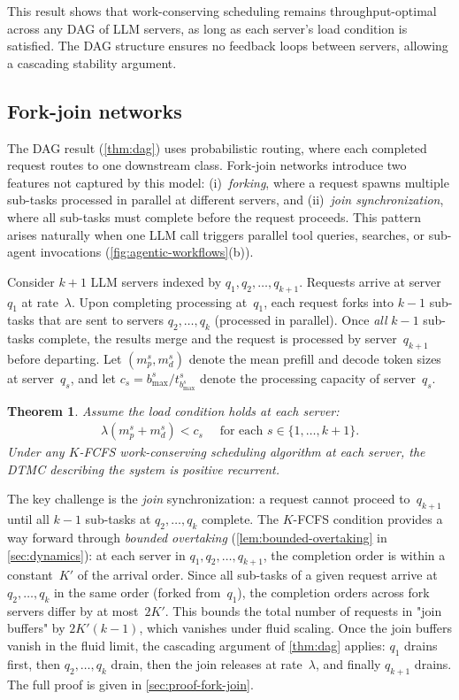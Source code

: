 \documentclass[11pt]{article}
\theoremstyle{plain}
\newtheorem{theorem}{Theorem}
\theoremstyle{definition}
\theoremstyle{remark}
\begin{document}
This result shows that work-conserving scheduling remains throughput-optimal across any DAG of LLM servers, as long as each server's load condition is satisfied. The DAG structure ensures no feedback loops between servers, allowing a cascading stability argument.

\subsection{Fork-join networks}
\label{sec:fork-join}

The DAG result (\cref{thm:dag}) uses probabilistic routing, where each completed request routes to one downstream class. Fork-join networks introduce two features not captured by this model: (i)~\emph{forking}, where a request spawns multiple sub-tasks processed in parallel at different servers, and (ii)~\emph{join synchronization}, where all sub-tasks must complete before the request proceeds. This pattern arises naturally when one LLM call triggers parallel tool queries, searches, or sub-agent invocations (\cref{fig:agentic-workflows}(b)).

Consider $k+1$ LLM servers indexed by $q_1,q_2,\ldots,q_{k+1}$. Requests arrive at server~$q_1$ at rate~$\lambda$. Upon completing processing at~$q_1$, each request forks into $k-1$ sub-tasks that are sent to servers $q_2,\ldots,q_k$ (processed in parallel). Once \emph{all} $k-1$ sub-tasks complete, the results merge and the request is processed by server~$q_{k+1}$ before departing. Let $(m^s_p, m^s_d)$ denote the mean prefill and decode token sizes at server~$q_s$, and let $c_s = b^s_{\max}/t^s_{b^s_{\max}}$ denote the processing capacity of server~$q_s$.

\begin{theorem}\label{thm:fork-join}
Assume the load condition holds at each server:
\begin{align}
  \label{eq:fj}
    \lambda(m^s_p+m^s_d) < c_s \quad  \text{ for each }
s\in \{1, \ldots, k+1\}.
\end{align}
Under any $K$-FCFS work-conserving scheduling algorithm at each server, the DTMC describing the system is positive recurrent.
\end{theorem}

The key challenge is the \emph{join} synchronization: a request cannot proceed to~$q_{k+1}$ until all $k-1$ sub-tasks at $q_2,\ldots,q_k$ complete. The $K$-FCFS condition provides a way forward through \emph{bounded overtaking} (\cref{lem:bounded-overtaking} in \cref{sec:dynamics}): at each server in $q_1, q_2,\ldots,q_{k+1}$, the completion order is within a constant~$K'$ of the arrival order. Since all sub-tasks of a given request arrive at $q_2,\ldots,q_k$ in the same order (forked from~$q_1$), the completion orders across fork servers differ by at most~$2K'$. This bounds the total number of 
requests in "join buffers" by $2K'(k-1)$, which vanishes under fluid scaling. Once the join buffers vanish in the fluid limit, the cascading argument of \cref{thm:dag} applies: $q_1$ drains first, then $q_2,\ldots,q_k$ drain, then the join releases at rate~$\lambda$, and finally $q_{k+1}$ drains. The full proof is given in \cref{sec:proof-fork-join}.
\end{document}
